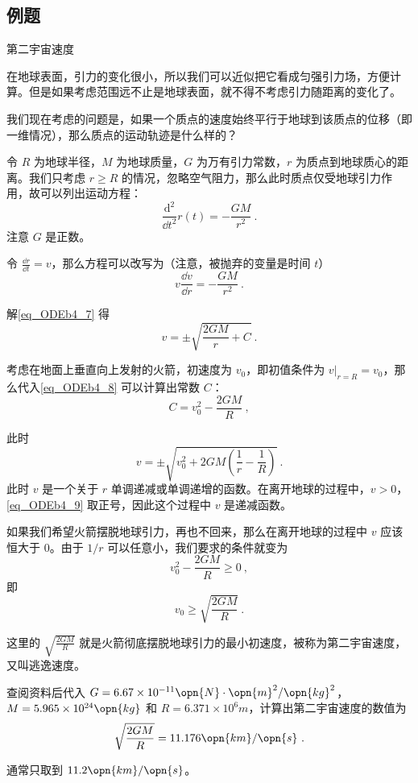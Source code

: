 \subsection{例题}

\begin{example}{第二宇宙速度}

在地球表面，引力的变化很小，所以我们可以近似把它看成匀强引力场，方便计算。但是如果考虑范围远不止是地球表面，就不得不考虑引力随距离的变化了。

我们现在考虑的问题是，如果一个质点的速度始终平行于地球到该质点的位移（即一维情况），那么质点的运动轨迹是什么样的？

令 $R$ 为地球半径，$M$ 为地球质量，$G$ 为万有引力常数，$r$ 为质点到地球质心的距离。我们只考虑 $r\geq R$ 的情况，忽略空气阻力，那么此时质点仅受地球引力作用，故可以列出运动方程：
\begin{equation}
\frac{\mathrm{d}^2}{\dd t^2}r(t)=-\frac{GM}{r^2}~.
\end{equation}
注意 $G$ 是正数。

令 $\frac{\dd r}{\dd t}=v$，那么方程可以改写为（注意，被抛弃的变量是时间 $t$）
\begin{equation}\label{eq_ODEb4_7}
v\frac{\dd v}{\dd r}=-\frac{GM}{r^2}~.
\end{equation}

解\autoref{eq_ODEb4_7} 得
\begin{equation}\label{eq_ODEb4_8}
v=\pm\sqrt{\frac{2GM}{r}+C}~.
\end{equation}

考虑在地面上垂直向上发射的火箭，初速度为 $v_0$，即初值条件为 $v|_{r=R}=v_0$，那么代入\autoref{eq_ODEb4_8} 可以计算出常数 $C$：
\begin{equation}
C=v_0^2-\frac{2GM}{R}~,
\end{equation}

此时
\begin{equation}\label{eq_ODEb4_9}
v=\pm\sqrt{v_0^2+2GM(\frac{1}{r}-\frac{1}{R})}~.
\end{equation}
此时 $v$ 是一个关于 $r$ 单调递减或单调递增的函数。在离开地球的过程中，$v>0$，\autoref{eq_ODEb4_9} 取正号，因此这个过程中 $v$ 是递减函数。

如果我们希望火箭摆脱地球引力，再也不回来，那么在离开地球的过程中 $v$ 应该恒大于 $0$。由于 $1/r$ 可以任意小，我们要求的条件就变为
\begin{equation}
v_0^2-\frac{2GM}{R}\geq 0~,
\end{equation}
即
\begin{equation}
v_0\geq\sqrt{\frac{2GM}{R}}~.
\end{equation}

这里的 $\sqrt{\frac{2GM}{R}}$ 就是火箭彻底摆脱地球引力的最小初速度，被称为第二宇宙速度，又叫逃逸速度。

查阅资料后代入 $G=6.67\times10^{-11} \opn{N}\cdot\opn{m}^2/\opn{kg}^2$，$M=5.965\times10^{24}\opn{kg}$ 和 $R=6.371\times10^{6}m$，计算出第二宇宙速度的数值为
\begin{equation}
\sqrt{\frac{2GM}{R}}=11.176\opn{km}/\opn{s}~.
\end{equation}

通常只取到 $11.2\opn{km}/\opn{s}$。

\end{example}
















